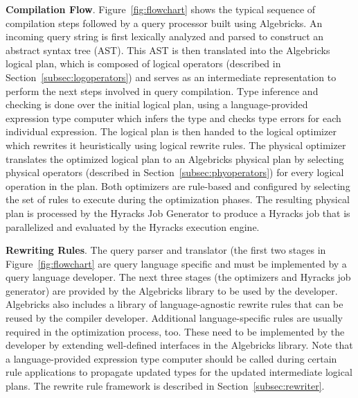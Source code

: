\textbf{Compilation Flow}. 
Figure~\ref{fig:flowchart} shows the typical sequence of compilation steps followed by a query processor built using Algebricks. 
An incoming query string is first lexically analyzed and parsed to construct an abstract syntax tree (AST).
This AST is then translated into 
the Algebricks logical plan, which is composed of logical operators (described in
Section~\ref{subsec:logoperators}) and serves as an intermediate representation to perform the next steps involved in query compilation. 
Type inference and checking is done over the initial logical plan, using a language-provided expression type computer which infers the type and checks type errors for each individual expression. 
The logical plan is then handed to the logical optimizer which rewrites it heuristically using logical rewrite rules. 
The physical optimizer translates the optimized logical plan to an Algebricks physical plan by selecting physical operators (described in
Section~\ref{subsec:phyoperators}) for every logical operation in the plan.
Both optimizers are rule-based and configured by selecting the set of rules to execute during the optimization phases.
The resulting physical plan is processed by the Hyracks Job Generator to produce a Hyracks job that is parallelized and evaluated by the Hyracks
execution engine.

\textbf{Rewriting Rules}. 
The query parser and translator (the first two stages in Figure~\ref{fig:flowchart} are query language specific and must be implemented by a query language developer. 
The next three stages (the optimizers and Hyracks job generator) are provided by the Algebricks library to be used by the developer. 
Algebricks also includes a library of language-agnostic rewrite rules that can be reused by the compiler developer. 
Additional language-specific rules are usually required in the optimization process, too. 
These need to be implemented by the developer by extending well-defined interfaces in the Algebricks library.
Note that a language-provided expression type computer should be called during certain rule applications to propagate updated types for the updated intermediate logical plans. 
The rewrite rule framework is described in Section~\ref{subsec:rewriter}.

